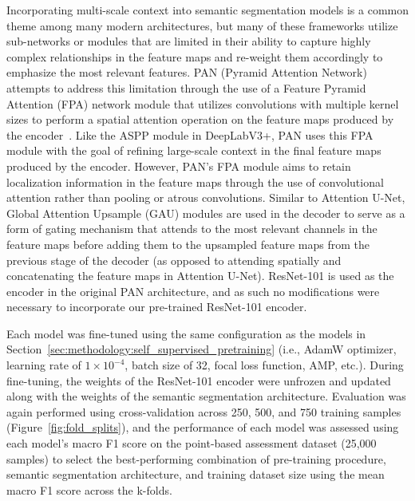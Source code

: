 Incorporating multi-scale context into semantic segmentation models is a common theme among many modern architectures, but many of these frameworks utilize sub-networks or modules that are limited in their ability to capture highly complex relationships in the feature maps and re-weight them accordingly to emphasize the most relevant features.
PAN (Pyramid Attention Network) attempts to address this limitation through the use of a Feature Pyramid Attention (FPA) network module that utilizes convolutions with multiple kernel sizes to perform a spatial attention operation on the feature maps produced by the encoder~\citep{liPyramidAttentionNetwork2018}.
Like the ASPP module in DeepLabV3+, PAN uses this FPA module with the goal of refining large-scale context in the final feature maps produced by the encoder.
However, PAN's FPA module aims to retain localization information in the feature maps through the use of convolutional attention rather than pooling or atrous convolutions.
Similar to Attention U-Net, Global Attention Upsample (GAU) modules are used in the decoder to serve as a form of gating mechanism that attends to the most relevant channels in the feature maps before adding them to the upsampled feature maps from the previous stage of the decoder (as opposed to attending spatially and concatenating the feature maps in Attention U-Net).
ResNet-101 is used as the encoder in the original PAN architecture, and as such no modifications were necessary to incorporate our pre-trained ResNet-101 encoder.






Each model was fine-tuned using the same configuration as the models in Section~\ref{sec:methodology:self_supervised_pretraining} (i.e., AdamW optimizer, learning rate of \(1 \times 10^{-4}\), batch size of 32, focal loss function, AMP, etc.).
During fine-tuning, the weights of the ResNet-101 encoder were unfrozen and updated along with the weights of the semantic segmentation architecture.
Evaluation was again performed using cross-validation across 250, 500, and 750 training samples (Figure~\ref{fig:fold_splits}), and the performance of each model was assessed using each model's macro F1 score on the point-based assessment dataset (25,000 samples) to select the best-performing combination of pre-training procedure, semantic segmentation architecture, and training dataset size using the mean macro F1 score across the k-folds.



